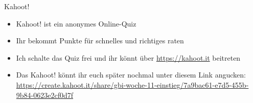 
%	

\framePrevEpisode

\begin{frame}{Kahoot!}
	\begin{itemize}[<+->]
		\item Kahoot! ist ein anonymes Online-Quiz
		\item Ihr bekommt Punkte für schnelles und richtiges raten
		\item Ich schalte das Quiz frei und ihr könnt über \url{https://kahoot.it} beitreten
		\item Das Kahoot! könnt ihr euch später nochmal unter diesem Link angucken: \\
			\url{https://create.kahoot.it/share/gbi-woche-11-einstieg/7a9bac61-e7d5-455b-9b84-0623e2cf0d7f}
	\end{itemize}
\end{frame}


